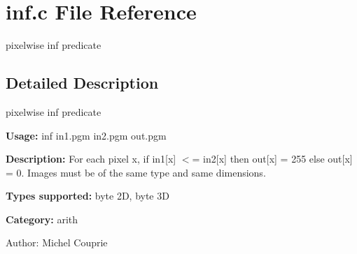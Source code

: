 \section{inf.c File Reference}
\label{inf_8c}
pixelwise inf predicate 



\subsection{Detailed Description}
pixelwise inf predicate 

{\bf Usage:} inf in1.pgm in2.pgm out.pgm

{\bf Description:} For each pixel x, if in1[x] $<$= in2[x] then out[x] = 255 else out[x] = 0. Images must be of the same type and same dimensions.

{\bf Types supported:} byte 2D, byte 3D

{\bf Category:} arith

\begin{Desc}
\item[Author:]Michel Couprie \end{Desc}
